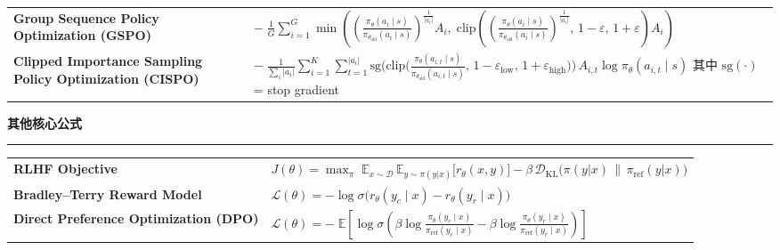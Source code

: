 \documentclass[9pt]{extarticle}
\begin{document}
\begin{center}
\begin{tabularx}{0.92\textwidth}{>{\raggedright\arraybackslash\bfseries}p{5.8cm} @{\quad} X}
Group Sequence Policy Optimization
\newline\mdseries (GSPO)
&
$\displaystyle -\;\frac{1}{G}\sum_{i=1}^{G}\min\!\left(\!\left(\frac{\pi_\theta(a_i\mid s)}{\pi_{\theta_{\text{old}}}(a_i\mid s)}\right)^{\!\frac{1}{|a_i|}} A_i,\; \mathrm{clip}\!\left(\!\left(\frac{\pi_\theta(a_i\mid s)}{\pi_{\theta_{\text{old}}}(a_i\mid s)}\right)^{\!\frac{1}{|a_i|}},\, 1\!-\!\varepsilon,\, 1\!+\!\varepsilon\right) A_i\right)$
\\[30pt]

Clipped Importance Sampling Policy Optimization
\newline\mdseries (CISPO)
&
$\displaystyle -\;\frac{1}{\sum_i |a_i|}\sum_{i=1}^{K}\sum_{t=1}^{|a_i|} \mathrm{sg}\!\Big(\mathrm{clip}\big(\tfrac{\pi_\theta(a_{i,t}\mid s)}{\pi_{\theta_{\text{old}}}(a_{i,t}\mid s)},\, 1\!-\!\varepsilon_{\text{low}},\, 1\!+\!\varepsilon_{\text{high}}\big)\Big)\, A_{i,t} \log \pi_\theta(a_{i,t}\mid s)$
\newline
其中 $\mathrm{sg}(\cdot)$ = stop gradient
\\
\end{tabularx}
\end{center}

\vspace{6pt}
{\centering\textbf{其他核心公式}\par}
\vspace{2pt}
\hrule
\vspace{6pt}

\begin{center}
\begin{tabularx}{0.92\textwidth}{>{\raggedright\arraybackslash\bfseries}p{5.8cm} @{\quad} X}

RLHF Objective
&
$\displaystyle J(\theta) = \max_{\pi}\; \mathbb{E}_{x \sim \mathcal{D}}\,\mathbb{E}_{y \sim \pi(y|x)} \Big[r_\theta(x, y)\Big] - \beta\, \mathcal{D}_{\text{KL}}\!\Big(\pi(y|x) \,\|\, \pi_{\text{ref}}(y|x)\Big)$
\\[14pt]

Bradley--Terry
\newline Reward Model
&
$\displaystyle \mathcal{L}(\theta) = -\log \sigma\!\Big( r_{\theta}(y_c \mid x) - r_{\theta}(y_r \mid x) \Big)$
\\[14pt]

Direct Preference Optimization
\newline\mdseries (DPO)
&
$\displaystyle \mathcal{L}(\theta) = -\;\mathbb{E}\!\left[ \log \sigma\!\left( \beta \log \frac{\pi_{\theta}(y_c \mid x)}{\pi_{\text{ref}}(y_c \mid x)} - \beta \log \frac{\pi_{\theta}(y_r \mid x)}{\pi_{\text{ref}}(y_r \mid x)} \right) \right]$
\\
\end{tabularx}
\end{center}
\end{document}

